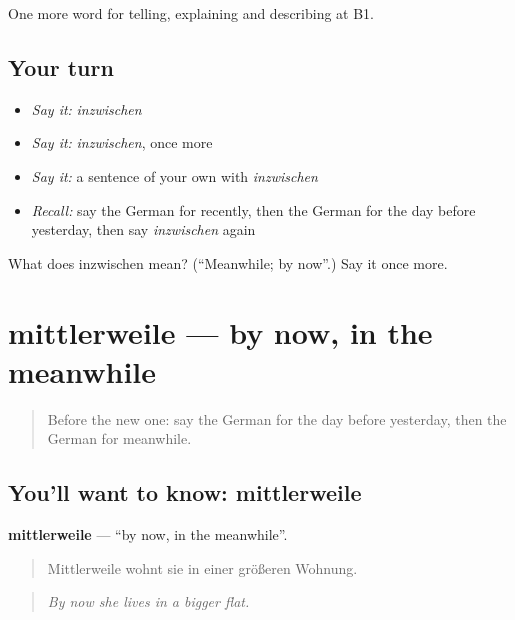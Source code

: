 \begin{grammarlens}[title={What you've built}]
One more word for telling, explaining and describing at B1.
\end{grammarlens}

\subsection*{Your turn}
\begin{itemize}
\raggedright
  \item \emph{Say it:} \emph{inzwischen}
  \item \emph{Say it:} \emph{inzwischen}, once more
  \item \emph{Say it:} a sentence of your own with \emph{inzwischen}
  \item \emph{Recall:} say the German for recently, then the German for the day before yesterday, then say \emph{inzwischen} again
\end{itemize}

\begin{tcolorbox}[breakable,colback=teal!4,colframe=teal!35!black,title={Before you move on}]
What does inzwischen mean? (\textquotedblleft{}Meanwhile; by now\textquotedblright{}.) Say it once more.
\end{tcolorbox}
\section[mittlerweile]{mittlerweile — by now, in the meanwhile}

\label{lesson:GE-C265-mittlerweile}



\begin{quote}
Before the new one: say the German for the day before yesterday, then the German for meanwhile.
\end{quote}

\subsection*{You'll want to know: mittlerweile}
\textbf{mittlerweile} — \textquotedblleft{}by now, in the meanwhile\textquotedblright{}.

\begin{quote}
Mittlerweile wohnt sie in einer größeren Wohnung.
\end{quote}

\begin{quote}
\emph{By now she lives in a bigger flat.}
\end{quote}

